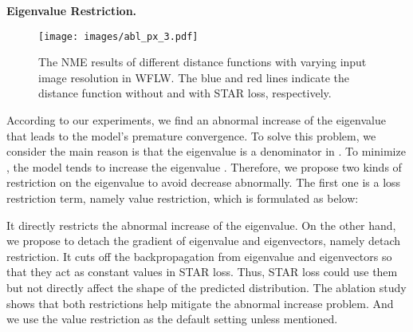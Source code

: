 \documentclass[10pt,twocolumn,letterpaper]{article}
\begin{document}
\noindent\textbf{Eigenvalue Restriction.}
\begin{figure*}[t]
    \centering
    \texttt{[image: images/abl\_px\_3.pdf]}
    \vspace{-0.5em}
    \caption{
    The NME results of different distance functions with varying input image resolution in WFLW. 
    The {\color{blue}blue} and {\color{red}red} lines indicate the distance function without and with STAR loss, respectively.}
    \vspace{-1.0em}
    \label{fig: abl-px}
\end{figure*}
According to our experiments, we find an abnormal increase of the eigenvalue  that leads to the model's premature convergence.
To solve this problem, we consider the main reason is that the eigenvalue  is a denominator in .
To minimize , the model tends to increase the eigenvalue .
Therefore, we propose two kinds of restriction on the eigenvalue to avoid  decrease abnormally.
The first one is a loss restriction term, namely value restriction, which is formulated as below:



It directly restricts the abnormal increase of the eigenvalue.
On the other hand, we propose to detach the gradient of eigenvalue and eigenvectors, namely detach restriction.
It cuts off the backpropagation from eigenvalue and eigenvectors so that they act as constant values in STAR loss.
Thus, STAR loss could use them but not directly affect the shape of the predicted distribution.
The ablation study shows that both restrictions help mitigate the abnormal increase problem.
And we use the value restriction as the default setting unless mentioned.
\end{document}
